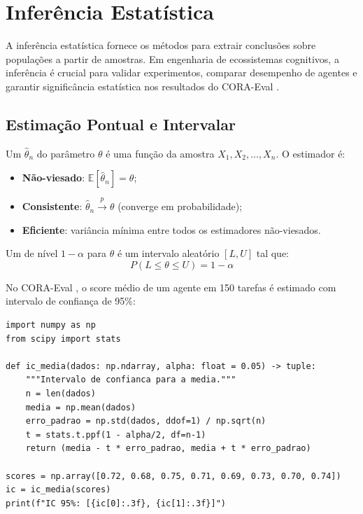 \section{Inferência Estatística}
\label{sec:inferencia-estatistica}
\nivelavancado

A inferência estatística fornece os métodos para extrair conclusões sobre
populações a partir de amostras. Em engenharia de ecossistemas cognitivos,
a inferência é crucial para validar experimentos, comparar desempenho de
agentes e garantir significância estatística nos resultados do CORA-Eval
\cite{wasserman2004all, hastie2009elements, box1976science}.

\subsection{Estimação Pontual e Intervalar}

\begin{definicao}[Estimador]
    Um  $\hat{\theta}_n$ do parâmetro $\theta$ é uma
    função da amostra $X_1, X_2, \ldots, X_n$. O estimador é:
    \begin{itemize}
        \item \textbf{Não-viesado}: $\mathbb{E}[\hat{\theta}_n] = \theta$;
        \item \textbf{Consistente}: $\hat{\theta}_n \xrightarrow{p} \theta$
              (converge em probabilidade);
        \item \textbf{Eficiente}: variância mínima entre todos os estimadores
              não-viesados.
    \end{itemize}
\end{definicao}

\begin{definicao}
    Um  de nível $1 - \alpha$ para
    $\theta$ é um intervalo aleatório $[L, U]$ tal que:
    \[
    P(L \leq \theta \leq U) = 1 - \alpha
    \]
\end{definicao}

\begin{exemplo}
    No CORA-Eval \cite{laranjeira2026cora}, o score médio de um agente em
    150 tarefas é estimado com intervalo de confiança de 95\%:
    \begin{lstlisting}[style=pythonstyle]
import numpy as np
from scipy import stats

def ic_media(dados: np.ndarray, alpha: float = 0.05) -> tuple:
    """Intervalo de confianca para a media."""
    n = len(dados)
    media = np.mean(dados)
    erro_padrao = np.std(dados, ddof=1) / np.sqrt(n)
    t = stats.t.ppf(1 - alpha/2, df=n-1)
    return (media - t * erro_padrao, media + t * erro_padrao)

scores = np.array([0.72, 0.68, 0.75, 0.71, 0.69, 0.73, 0.70, 0.74])
ic = ic_media(scores)
print(f"IC 95%: [{ic[0]:.3f}, {ic[1]:.3f}]")
    \end{lstlisting}
\end{exemplo}

